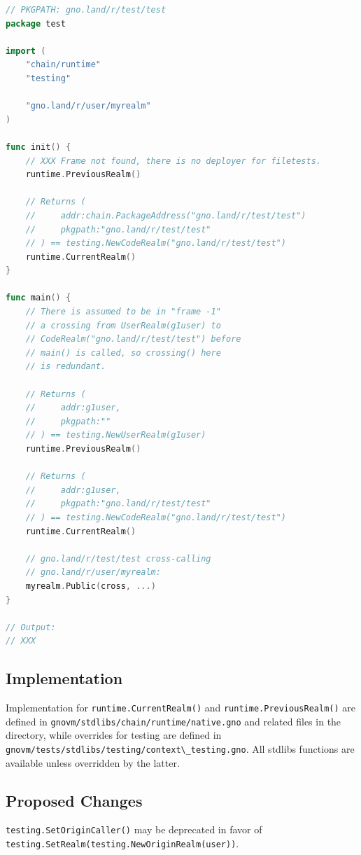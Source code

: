 \documentclass[12pt,a4paper]{article}
\newcommand{\passthrough}[1]{#1}
\begin{document}
\begin{lstlisting}[language=Go]
// PKGPATH: gno.land/r/test/test
package test

import (
    "chain/runtime"
    "testing"

    "gno.land/r/user/myrealm"
)

func init() {
    // XXX Frame not found, there is no deployer for filetests.
    runtime.PreviousRealm()

    // Returns (
    //     addr:chain.PackageAddress("gno.land/r/test/test")
    //     pkgpath:"gno.land/r/test/test"
    // ) == testing.NewCodeRealm("gno.land/r/test/test")
    runtime.CurrentRealm()
}

func main() {
    // There is assumed to be in "frame -1"
    // a crossing from UserRealm(g1user) to
    // CodeRealm("gno.land/r/test/test") before
    // main() is called, so crossing() here
    // is redundant.

    // Returns (
    //     addr:g1user,
    //     pkgpath:""
    // ) == testing.NewUserRealm(g1user)
    runtime.PreviousRealm()

    // Returns (
    //     addr:g1user,
    //     pkgpath:"gno.land/r/test/test"
    // ) == testing.NewCodeRealm("gno.land/r/test/test")
    runtime.CurrentRealm()

    // gno.land/r/test/test cross-calling
    // gno.land/r/user/myrealm:
    myrealm.Public(cross, ...)
}

// Output:
// XXX
\end{lstlisting}

\subsection{Implementation}\label{implementation}

Implementation for \passthrough{\lstinline!runtime.CurrentRealm()!} and
\passthrough{\lstinline!runtime.PreviousRealm()!} are defined in
\passthrough{\lstinline!gnovm/stdlibs/chain/runtime/native.gno!} and
related files in the directory, while overrides for testing are defined
in
\passthrough{\lstinline!gnovm/tests/stdlibs/testing/context\_testing.gno!}.
All stdlibs functions are available unless overridden by the latter.

\subsection{Proposed Changes}\label{proposed-changes}

\passthrough{\lstinline!testing.SetOriginCaller()!} may be deprecated in
favor of
\passthrough{\lstinline!testing.SetRealm(testing.NewOriginRealm(user))!}.
\end{document}
